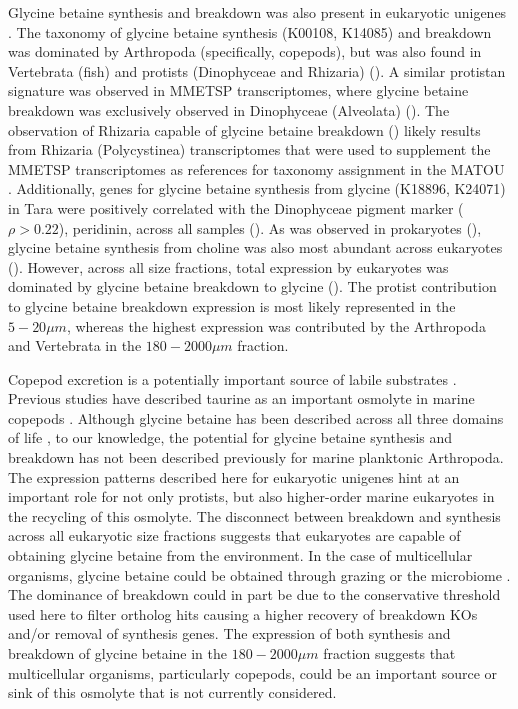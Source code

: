 \documentclass[utf8]{frontiersSCNS} %
\begin{document}
Glycine betaine synthesis and breakdown was also present in eukaryotic unigenes \citep{Carradec2018}. The taxonomy of glycine betaine synthesis (K00108, K14085) and breakdown was dominated by Arthropoda (specifically, copepods), but was also found in Vertebrata (fish) and protists (Dinophyceae and Rhizaria) (). A similar protistan signature was observed in MMETSP transcriptomes, where glycine betaine breakdown was exclusively observed in Dinophyceae (Alveolata) (). The observation of Rhizaria capable of glycine betaine breakdown () likely results from Rhizaria (Polycystinea) transcriptomes that were used to supplement the MMETSP transcriptomes as references for taxonomy assignment in the MATOU \citep{Carradec2018}. Additionally, genes for glycine betaine synthesis from glycine (K18896, K24071) in Tara were positively correlated with the Dinophyceae pigment marker ($\rho > 0.22$), peridinin, across all samples (). As was observed in prokaryotes (), glycine betaine synthesis from choline was also most abundant across eukaryotes (). However, across all size fractions, total expression by eukaryotes was dominated by glycine betaine breakdown to glycine (). The protist contribution to glycine betaine breakdown expression is most likely represented in the $5-20\mu m$, whereas the highest expression was contributed by the Arthropoda and Vertebrata in the $180-2000\mu m$ fraction.

Copepod excretion is a potentially important source of labile substrates \citep{Maas2020}. Previous studies have described taurine as an important osmolyte in marine copepods \citep{Clifford2020}. Although glycine betaine has been described across all three domains of life \citep{Yancey2005}, to our knowledge, the potential for glycine betaine synthesis and breakdown has not been described previously for marine planktonic Arthropoda. The expression patterns described here for eukaryotic unigenes hint at an important role for not only protists, but also higher-order marine eukaryotes in the recycling of this osmolyte. The disconnect between breakdown and synthesis across all eukaryotic size fractions suggests that eukaryotes are capable of obtaining glycine betaine from the environment. In the case of multicellular organisms, glycine betaine could be obtained through grazing or the microbiome \citep{Shoemaker2017}. The dominance of breakdown could in part be due to the conservative threshold used here to filter ortholog hits causing a higher recovery of breakdown KOs and/or removal of synthesis genes. The expression of both synthesis and breakdown of glycine betaine in the $180-2000 \mu m$ fraction suggests that multicellular organisms, particularly copepods, could be an important source or sink of this osmolyte that is not currently considered.
\end{document}
